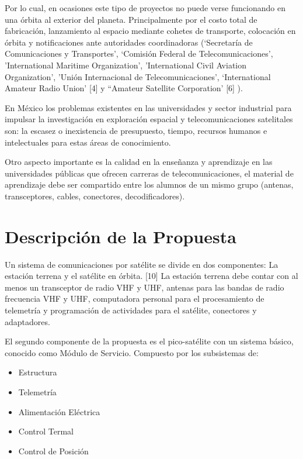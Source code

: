 Por lo cual, en ocasiones este tipo de proyectos no puede verse funcionando en una \'{o}rbita al exterior del planeta. Principalmente por el costo total de fabricaci\'{o}n, lanzamiento al espacio mediante cohetes de transporte, colocaci\'{o}n en \'{o}rbita y notificaciones ante autoridades coordinadoras (‘Secretar\'{i}a de Comunicaciones y Transportes’, ‘Comisi\'{o}n Federal de Telecomunicaciones’, 'International Maritime Organization',  'International Civil Aviation Organization', 'Uni\'{o}n Internacional de Telecomunicaciones', ‘International Amateur Radio Union’ [4] y “Amateur Satellite Corporation’ [6] ). 


En M\'{e}xico los problemas existentes en las universidades y sector industrial para impulsar la investigaci\'{o}n en exploraci\'{o}n espacial y telecomunicaciones satelitales son: la escasez o inexistencia de presupuesto, tiempo, recursos humanos e intelectuales para estas \'{a}reas de conocimiento.


Otro aspecto importante es la calidad en la ense\~{n}anza y aprendizaje en las universidades p\'{u}blicas que ofrecen carreras de telecomunicaciones, el material de aprendizaje debe ser compartido entre los alumnos de un mismo grupo (antenas, transceptores, cables, conectores, decodificadores).

\section{Descripci\'{o}n de la Propuesta}
Un sistema de comunicaciones por sat\'{e}lite se divide en dos componentes: La estaci\'{o}n terrena y el sat\'{e}lite en \'{o}rbita. [10] La estaci\'{o}n terrena debe contar con al menos un transceptor de radio VHF y UHF, antenas para las bandas de radio frecuencia VHF y UHF, computadora personal para el procesamiento de telemetr\'{i}a y programaci\'{o}n de actividades para el sat\'{e}lite, conectores y adaptadores.


El segundo componente de la propuesta es el pico-sat\'{e}lite con un sistema b\'{a}sico, conocido como M\'{o}dulo de Servicio. Compuesto por los subsistemas de:

\begin{itemize}
\item Estructura
\item Telemetr\'{i}a
\item Alimentaci\'{o}n El\'{e}ctrica
\item Control Termal
\item Control de Posici\'{o}n
\end{itemize}

